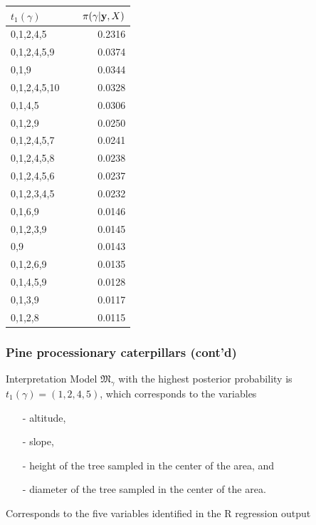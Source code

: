 \begin{frame}
\begin{center}
\footnotesize
\begin{tabular}{l c| r}
  $t_1(\gamma)\ $ && $\ \pi(\gamma|\by,X)$ \\
 \hline 0,1,2,4,5 && 0.2316 \\
 0,1,2,4,5,9   && 0.0374 \\
 0,1,9         && 0.0344 \\
 0,1,2,4,5,10  && 0.0328 \\
 0,1,4,5       && 0.0306 \\
 0,1,2,9       && 0.0250 \\
 0,1,2,4,5,7   && 0.0241 \\
 0,1,2,4,5,8   && 0.0238 \\
 0,1,2,4,5,6   && 0.0237 \\
 0,1,2,3,4,5   && 0.0232 \\
 0,1,6,9       && 0.0146 \\
 0,1,2,3,9     && 0.0145 \\
 0,9           && 0.0143 \\
 0,1,2,6,9     && 0.0135 \\
 0,1,4,5,9     && 0.0128 \\
 0,1,3,9       && 0.0117 \\
 0,1,2,8       && 0.0115 \\
\end{tabular}                      
\normalsize
\end{center}

\end{frame}\begin{frame} \frametitle{Pine processionary caterpillars (cont'd)}

\begin{block}{Interpretation} Model $\mathfrak{M}_\gamma$ with the highest posterior probability
is $t_1(\gamma)=(1,2,4,5)$, which corresponds to the variables
\begin{itemize}
\item[-] altitude,
\item[-] slope,
\item[-] height of the tree sampled in the center of the area, and
\item[-] diameter of the tree sampled in the center of the area.
\end{itemize}
\end{block}

\pause\vs
Corresponds to the five variables identified in the {\sf R} regression output


\end{frame}
